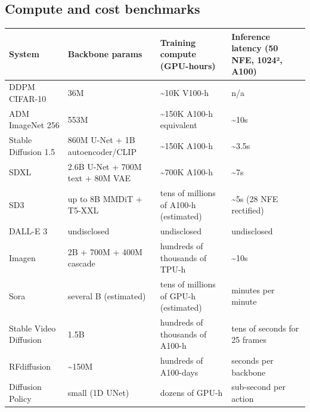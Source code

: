 \subsection{Compute and cost benchmarks}\label{compute-and-cost-benchmarks}

{\def\LTcaptype{none} %
\begin{longtable}[]{@{}
  >{\raggedright\arraybackslash}p{}
  >{\raggedright\arraybackslash}p{}
  >{\raggedright\arraybackslash}p{}
  >{\raggedright\arraybackslash}p{}@{}}
\toprule\noalign{}
\begin{minipage}[b]{\linewidth}\raggedright
System
\end{minipage} & \begin{minipage}[b]{\linewidth}\raggedright
Backbone params
\end{minipage} & \begin{minipage}[b]{\linewidth}\raggedright
Training compute (GPU-hours)
\end{minipage} & \begin{minipage}[b]{\linewidth}\raggedright
Inference latency (50 NFE, 1024², A100)
\end{minipage} \\
\midrule\noalign{}
\endhead
\bottomrule\noalign{}
\endlastfoot
DDPM CIFAR-10 & 36M & \textasciitilde10K V100-h & n/a \\
ADM ImageNet 256 & 553M & \textasciitilde150K A100-h equivalent & \textasciitilde10s \\
Stable Diffusion 1.5 & 860M U-Net + 1B autoencoder/CLIP & \textasciitilde150K A100-h & \textasciitilde3.5s \\
SDXL & 2.6B U-Net + 700M text + 80M VAE & \textasciitilde700K A100-h & \textasciitilde7s \\
SD3 & up to 8B MMDiT + T5-XXL & tens of millions of A100-h (estimated) & \textasciitilde5s (28 NFE rectified) \\
DALL-E 3 & undisclosed & undisclosed & undisclosed \\
Imagen & 2B + 700M + 400M cascade & hundreds of thousands of TPU-h & \textasciitilde10s \\
Sora & several B (estimated) & tens of millions of GPU-h (estimated) & minutes per minute \\
Stable Video Diffusion & 1.5B & hundreds of thousands of A100-h & tens of seconds for 25 frames \\
RFdiffusion & \textasciitilde150M & hundreds of A100-days & seconds per backbone \\
Diffusion Policy & small (1D UNet) & dozens of GPU-h & sub-second per action \\
\end{longtable}
}

